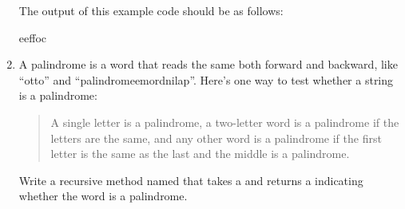 \begin{exercise}
\begin{enumerate}
The output of this example code should be as follows:

\begin{stdout}
eeffoc
\end{stdout}


\item A palindrome is a word that reads the same both forward and backward, like ``otto'' and ``palindromeemordnilap''.
Here's one way to test whether a string is a palindrome:

\begin{quotation}
\noindent
A single letter is a palindrome, a two-letter word is a palindrome if the letters are the same, and any other word is a palindrome if the first letter is the same as the last and the middle is a palindrome.
\end{quotation}

Write a recursive method named  that takes a  and returns a  indicating whether the word is a palindrome.

\end{enumerate}

\end{exercise}
